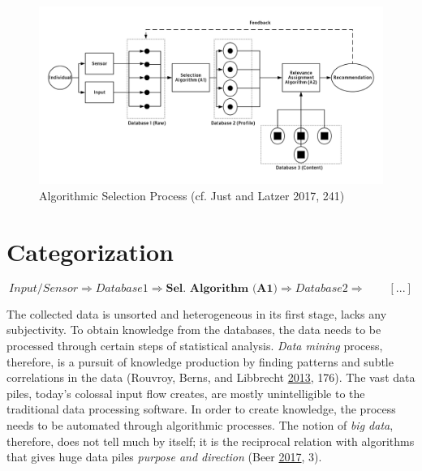 \documentclass[12pt,twoside]{report}
\begin{document}
\begin{figure}

{\centering \includegraphics{AlSel} 

}

\caption{Algorithmic Selection Process (cf. Just and Latzer 2017, 241)}\label{fig:AlSel}
\end{figure}

\hypertarget{categorization}{%
\section{Categorization}\label{categorization}}

\[Input/Sensor \Rightarrow Database 1 \Rightarrow \textbf{Sel. Algorithm (A1)}  \Rightarrow  Database2 \Rightarrow \qquad [...]\]

The collected data is unsorted and heterogeneous in its first stage, lacks any subjectivity. To obtain knowledge from the databases, the data needs to be processed through certain steps of statistical analysis. \emph{Data mining} process, therefore, is a pursuit of knowledge production by finding patterns and subtle correlations in the data (Rouvroy, Berns, and Libbrecht \protect\hyperlink{ref-Rouvroy2013}{2013}, 176). The vast data piles, today's colossal input flow creates, are mostly unintelligible to the traditional data processing software. In order to create knowledge, the process needs to be automated through algorithmic processes. The notion of \emph{big data}, therefore, does not tell much by itself; it is the reciprocal relation with algorithms that gives huge data piles \emph{purpose and direction} (Beer \protect\hyperlink{ref-Beer2017}{2017}, 3).
\end{document}
